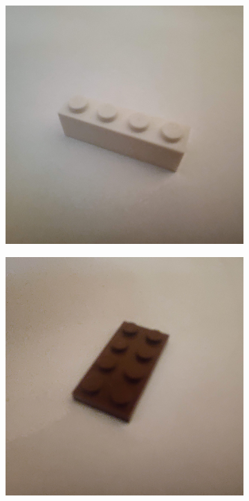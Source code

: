 \documentclass[]{article}
\begin{document}
\begin{figure}[h]
\begin{subfigure}[b]{0.2\textwidth}
    \end{subfigure}
    \begin{subfigure}[b]{0.2\textwidth}
        \includegraphics[width=\textwidth]{photographed images/7.jpg}
    \end{subfigure}
    \begin{subfigure}[b]{0.2\textwidth}
        \includegraphics[width=\textwidth]{photographed images/8.jpg}

\end{subfigure}
\end{figure}
\end{document}
